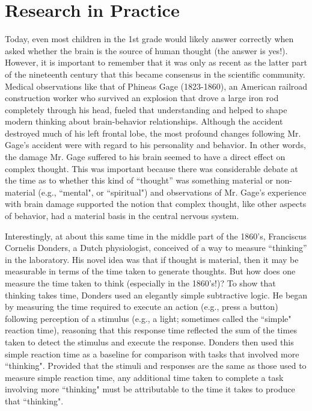 \section{Research in Practice}
Today, even most children in the 1st grade would likely answer correctly when asked whether the brain is the source of human thought (the answer is yes!). However, it is important to remember that it was only as recent as the latter part of the nineteenth century that this became consensus in the scientific community. Medical observations like that of Phineas Gage (1823-1860), an American railroad construction worker who survived an explosion that drove a large iron rod completely through his head, fueled that understanding and helped to shape modern thinking about brain-behavior relationships. Although the accident destroyed much of his left frontal lobe, the most profound changes following Mr. Gage's accident were with regard to his personality and behavior. In other words, the damage Mr. Gage suffered to his brain seemed to have a direct effect on complex thought. This was important because there was considerable debate at the time as to whether this kind of “thought” was something material or non-material (e.g., ``mental", or ``spiritual") and observations of Mr. Gage’s experience with brain damage supported the notion that complex thought, like other aspects of behavior, had a material basis in the central nervous system.

Interestingly, at about this same time in the middle part of the 1860’s, Franciscus Cornelis Donders, a Dutch physiologist, conceived of a way to measure “thinking” in the laboratory. His novel idea was that if thought is material, then it may be measurable in terms of the time taken to generate thoughts. But how does one measure the time taken to think (especially in the 1860’s!)? To show that thinking takes time, Donders used an elegantly simple subtractive logic. He began by measuring the time required to execute an action (e.g., press a button) following perception of a stimulus (e.g., a light; sometimes called the ``simple" reaction time), reasoning that this response time reflected the sum of the times taken to detect the stimulus and execute the response. Donders then used this simple reaction time as a baseline for comparison with tasks that involved more ``thinking". Provided that the stimuli and responses are the same as those used to measure simple reaction time, any additional time taken to complete a task involving more ``thinking" must be attributable to the time it takes to produce that ``thinking". 

